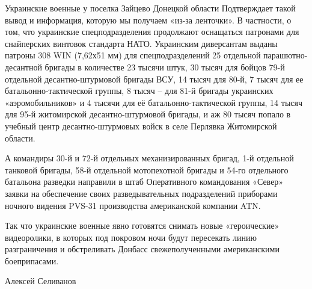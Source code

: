 Украинские военные у поселка Зайцево Донецкой области Подтверждает такой вывод
и информация, которую мы получаем «из-за ленточки». В частности, о том, что
украинские спецподразделения продолжают оснащаться патронами для снайперских
винтовок стандарта НАТО. Украинским диверсантам выданы патроны 308 WIN (7,62х51
мм) для спецподразделений 25 отдельной парашютно-десантной бригады в количестве
23 тысячи штук, 30 тысяч для бойцов 79-й отдельной десантно-штурмовой бригады
ВСУ, 14 тысяч для 80-й, 7 тысяч для ее батальонно-тактической группы, 8 тысяч –
для 81-й бригады украинских «аэромобильников» и 4 тысячи для её
батальонно-тактической группы, 14 тысяч для 95-й житомирской десантно-штурмовой
бригады, и аж 80 тысяч попало в учебный центр десантно-штурмовых войск в селе
Перлявка Житомирской области.

А командиры 30-й и 72-й отдельных механизированных бригад, 1-й отдельной
танковой бригады, 58-й отдельной мотопехотной бригады и 54-го отдельного
батальона разведки направили в штаб Оперативного командования «Север» заявки на
обеспечение своих разведывательных подразделений приборами ночного видения
PVS-31 производства американской компании ATN.

Так что украинские военные явно готовятся снимать новые «героические»
видеоролики, в которых под покровом ночи будут пересекать линию разграничения и
обстреливать Донбасс свежеполученными американскими боеприпасами.

Алексей Селиванов
  
